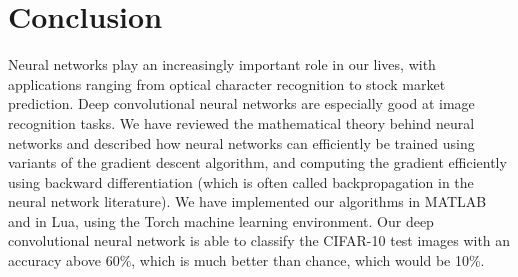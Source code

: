\documentclass[titlepage]{article}
\theoremstyle{plain}
\theoremstyle{definition}
\begin{document}
	\section{Conclusion} \label{Conclusion}
		Neural networks play an increasingly important role in our lives, with applications ranging from optical character recognition to stock market prediction. Deep convolutional neural networks are especially good at image recognition tasks. We have reviewed the mathematical theory behind neural networks and described how neural networks can efficiently be trained using variants of the gradient descent algorithm, and computing the gradient efficiently using backward differentiation (which is often called backpropagation in the neural network literature). We have implemented our algorithms in MATLAB and in Lua, using the Torch machine learning environment. Our deep convolutional neural network is able to classify the CIFAR-10 test images with an accuracy above 60\%, which is much better than chance, which would be 10\%.\\
\end{document}
